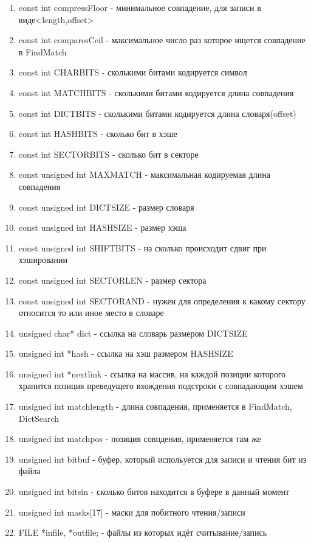 \documentclass[12pt]{article}
\begin{document}
\begin{enumerate}
	\item const int compressFloor - минимальное совпадение, для записи в виде<length,offset>
	\item const int comparesCeil  - максимальное число раз которое ищется совпадение в FindMatch
	\item const int CHARBITS    - сколькими битами кодируется символ    
	\item const int MATCHBITS     - сколькими битами кодируется длина совпадения     
	\item const int DICTBITS     - сколькими битами кодируется длина словаря(offset)     
	\item const int HASHBITS     - сколько бит в хэше
	\item const int SECTORBITS     - сколько бит в секторе    
	\item const unsigned int MAXMATCH - максимальная кодируемая длина совпадения
	\item const unsigned int DICTSIZE - размер словаря
	\item const unsigned int HASHSIZE - размер хэша
	\item const unsigned int SHIFTBITS  - на сколько происходит сдвиг при хэшировании
	\item const unsigned int SECTORLEN  - размер сектора
	\item const unsigned int SECTORAND  - нужен для определения к какому сектору относится то или иное место в словаре
	\item unsigned char* dict - ссылка на словарь размером DICTSIZE
	\item unsigned int *hash - ссылка на хэш размером HASHSIZE
	\item unsigned int *nextlink - ссылка на массив, на каждой позиции которого хранится позиция преведущего вхождения подстроки с совпадающим хэшем
	\item unsigned int matchlength - длина совпадения, применяется в FindMatch, DictSearch
	\item unsigned int  matchpos - позиция совпдения, применяется там же
	\item unsigned int  bitbuf - буфер, который испольуется для записи и чтения бит из файла
	\item unsigned int  bitsin - сколько битов находится в буфере в данный момент
	\item unsigned int  masks[17] - маски для побитного чтения/записи
	\item FILE *infile, *outfile; - файлы из которых идёт считывание/запись
\end{enumerate}
\end{document}
